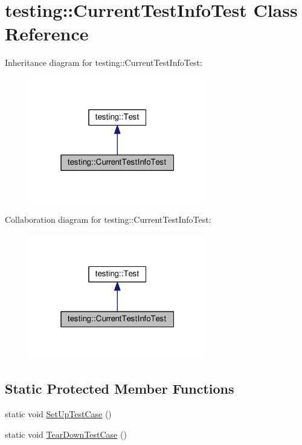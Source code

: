 \hypertarget{classtesting_1_1CurrentTestInfoTest}{}\section{testing\+:\+:Current\+Test\+Info\+Test Class Reference}
\label{classtesting_1_1CurrentTestInfoTest}


Inheritance diagram for testing\+:\+:Current\+Test\+Info\+Test\+:\nopagebreak
\begin{figure}[H]
\begin{center}
\leavevmode
\includegraphics[width=220pt]{classtesting_1_1CurrentTestInfoTest__inherit__graph}
\end{center}
\end{figure}


Collaboration diagram for testing\+:\+:Current\+Test\+Info\+Test\+:\nopagebreak
\begin{figure}[H]
\begin{center}
\leavevmode
\includegraphics[width=220pt]{classtesting_1_1CurrentTestInfoTest__coll__graph}
\end{center}
\end{figure}
\subsection*{Static Protected Member Functions}
\begin{DoxyCompactItemize}
\item 
static void \hyperlink{classtesting_1_1CurrentTestInfoTest_a61bad7ce29923afd464daf9684b6269e}{Set\+Up\+Test\+Case} ()
\item 
static void \hyperlink{classtesting_1_1CurrentTestInfoTest_a9a80a5a3e6e70c619870c2ae9df892a6}{Tear\+Down\+Test\+Case} ()
\end{DoxyCompactItemize}
